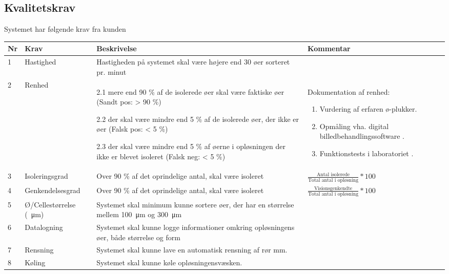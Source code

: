 \subsection{Kvalitetskrav}
\label{subsec:Kvalitetskrav}
Systemet har følgende krav fra kunden
\begin{center}
		\begin{longtable}{ | m{0.5cm} | m{3cm}| m{6cm}| m{4cm} |} 
			\hline
			\textbf{Nr} & \textbf{Krav} & \textbf{Beskrivelse} & \textbf{Kommentar} \\ 
			\hline
			1 & Hastighed & Hastigheden på systemet skal være højere end 30 øer sorteret pr. minut & \\
			\hline
			2 & Renhed & 2.1 mere end 90 \% af de isolerede øer skal være faktiske øer 
(Sandt pos: > 90 \%)

2.2 der skal være mindre end 5 \% af de isolerede øer, der ikke er øer
(Falsk pos: < 5 \%)

2.3 der skal være mindre end 5 \% af øerne i opløsningen der ikke er blevet isoleret
(Falsk neg: < 5 \%)
 & Dokumentation af renhed:
 \begin{enumerate}
 \item Vurdering af erfaren ø-plukker.
 \item Opmåling vha. digital billedbehandlingssoftware \citep{kskrav1}.
  \item Funktionstests i laboratoriet \citep{kskrav1} \citep{kskrav2}.
 \end{enumerate} \\
			\hline
			3 & Isoleringsgrad & Over 90 \% af det oprindelige antal, skal være isoleret &
			 $\frac{\text{Antal isolerede}}{\text{Total antal i opløsning}} * 100$\\
			\hline
			4 & Genkendelsesgrad & Over 90 \% af det oprindelige antal, skal være isoleret &
			 $\frac{\text{Visionsgenkendte}}{\text{Total antal i opløsning}} * 100$\\
			\hline
			5 & Ø/Cellestørrelse (\SI{}{\micro\metre}) & Systemet skal minimum kunne sortere øer, der 
har en størrelse mellem \SI{100}{\micro\metre} og \SI{300}{\micro\metre}
 &		\\
			\hline
			6 & Datalogning & Systemet skal kunne logge informationer omkring opløsningens øer, både størrelse og form & \\
			\hline
			7 & Rensning & Systemet skal kunne lave en automatisk rensning af rør mm. & \\
			\hline
			8 & Køling & Systemet skal kunne køle opløsningensvæsken. & \\
			\hline
		\end{longtable}
		
		
		
	\end{center}
	\pagebreak